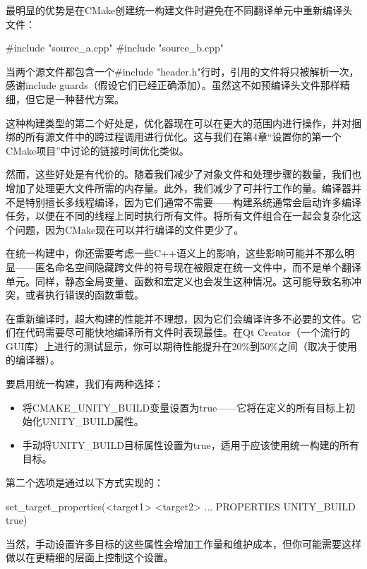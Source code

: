 最明显的优势是在CMake创建统一构建文件时避免在不同翻译单元中重新编译头文件：

\begin{cpp}
#include "source_a.cpp"
#include "source_b.cpp"
\end{cpp}

当两个源文件都包含一个\#include "header.h"行时，引用的文件将只被解析一次，感谢include guards（假设它们已经正确添加）。虽然这不如预编译头文件那样精细，但它是一种替代方案。

这种构建类型的第二个好处是，优化器现在可以在更大的范围内进行操作，并对捆绑的所有源文件中的跨过程调用进行优化。这与我们在第4章“设置你的第一个CMake项目”中讨论的链接时间优化类似。

然而，这些好处是有代价的。随着我们减少了对象文件和处理步骤的数量，我们也增加了处理更大文件所需的内存量。此外，我们减少了可并行工作的量。编译器并不是特别擅长多线程编译，因为它们通常不需要——构建系统通常会启动许多编译任务，以便在不同的线程上同时执行所有文件。将所有文件组合在一起会复杂化这个问题，因为CMake现在可以并行编译的文件更少了。

在统一构建中，你还需要考虑一些C++语义上的影响，这些影响可能并不那么明显——匿名命名空间隐藏跨文件的符号现在被限定在统一文件中，而不是单个翻译单元。同样，静态全局变量、函数和宏定义也会发生这种情况。这可能导致名称冲突，或者执行错误的函数重载。

在重新编译时，超大构建的性能并不理想，因为它们会编译许多不必要的文件。它们在代码需要尽可能快地编译所有文件时表现最佳。在Qt Creator（一个流行的GUI库）上进行的测试显示，你可以期待性能提升在20\%到50\%之间（取决于使用的编译器）。

要启用统一构建，我们有两种选择：

\begin{itemize}
\item
将CMAKE\_UNITY\_BUILD变量设置为true——它将在定义的所有目标上初始化UNITY\_BUILD属性。

\item
手动将UNITY\_BUILD目标属性设置为true，适用于应该使用统一构建的所有目标。
\end{itemize}

第二个选项是通过以下方式实现的：

\begin{shell}
set_target_properties(<target1> <target2> ...
                      PROPERTIES UNITY_BUILD true)
\end{shell}

当然，手动设置许多目标的这些属性会增加工作量和维护成本，但你可能需要这样做以在更精细的层面上控制这个设置。

